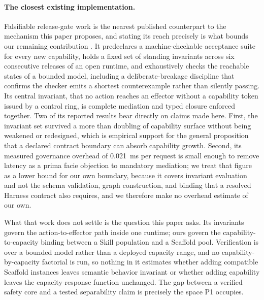 \documentclass[11pt]{article}
\begin{document}
\paragraph{The closest existing implementation.}
Falsifiable release-gate work is the nearest published counterpart to the mechanism this paper proposes, and stating its reach precisely is what bounds our remaining contribution \cite{soni2026gates}. It predeclares a machine-checkable acceptance suite for every new capability, holds a fixed set of standing invariants across six consecutive releases of an open runtime, and exhaustively checks the reachable states of a bounded model, including a deliberate-breakage discipline that confirms the checker emits a shortest counterexample rather than silently passing. Its central invariant, that no action reaches an effector without a capability token issued by a control ring, is complete mediation and typed closure enforced together. Two of its reported results bear directly on claims made here. First, the invariant set survived a more than doubling of capability surface without being weakened or redesigned, which is empirical support for the general proposition that a declared contract boundary can absorb capability growth. Second, its measured governance overhead of 0.021~ms per request is small enough to remove latency as a prima facie objection to mandatory mediation; we treat that figure as a lower bound for our own boundary, because it covers invariant evaluation and not the schema validation, graph construction, and binding that a resolved Harness contract also requires, and we therefore make no overhead estimate of our own.

What that work does not settle is the question this paper asks. Its invariants govern the action-to-effector path inside one runtime; ours govern the capability-to-capacity binding between a Skill population and a Scaffold pool. Verification is over a bounded model rather than a deployed capacity range, and no capability-by-capacity factorial is run, so nothing in it estimates whether adding compatible Scaffold instances leaves semantic behavior invariant or whether adding capability leaves the capacity-response function unchanged. The gap between a verified safety core and a tested separability claim is precisely the space P1 occupies.
\end{document}
